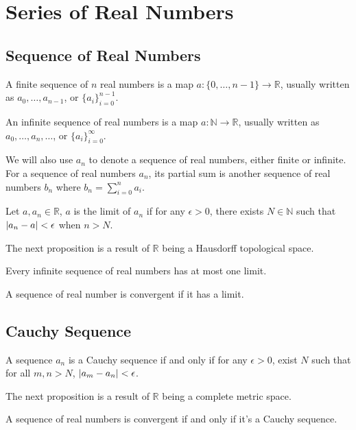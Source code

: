 \section{Series of Real Numbers}
\subsection{Sequence of Real Numbers}
A finite sequence of $n$ real numbers is a map $a : \{0, \dots, n - 1\} \to \mathbb R$, usually written as $a_0, \dots, a_{n - 1}$, or $\{a_i\}_{i=0}^{n-1}$.

An infinite sequence of real numbers is a map $a : \mathbb N \to \mathbb R$,
usually written as $a_0, \dots, a_n, \dots$, or $\{a_i\}_{i=0}^\infty$.

We will also use $a_n$ to denote a sequence of real numbers, either finite or
infinite. For a sequence of real numbers $a_n$, its partial sum is another
sequence of real numbers $b_n$ where $b_n = \sum_{i=0}^n a_i$.

\begin{defi}
Let $a, a_n \in \mathbb R$, $a$ is the limit of $a_n$ if for any $\epsilon > 0$, there exists $N \in \mathbb N$ such that $\left| {a_n - a} \right| < \epsilon$ when $n > N$.
\end{defi}

The next proposition is a result of $\mathbb R$ being a Hausdorff topological space.
\begin{pro}
Every infinite sequence of real numbers has at most one limit.
\end{pro}

\begin{defi}[convergence]
A sequence of real number is convergent if it has a limit.
\end{defi}

\subsection{Cauchy Sequence}

\begin{defi}
A sequence $a_n$ is a Cauchy sequence if and only if for any $\epsilon > 0$,
exist $N$ such that for all $m, n > N$, $\left| {a_m - a_n} \right| < \epsilon$.
\end{defi}

The next proposition is a result of $\mathbb R$ being a complete metric space.
\begin{pro}
A sequence of real numbers is convergent if and only if it's a Cauchy sequence.
\end{pro}

